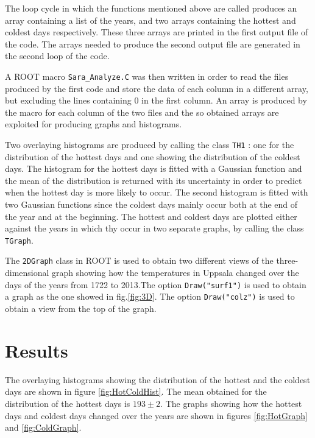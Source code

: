 \medskip

The loop cycle in which the functions mentioned above are called produces an array containing a list of the years, and two arrays containing the hottest and coldest days respectively. These three arrays are printed in the first output file of the code.
The arrays needed to produce the second output file are generated in the second loop of the code.

\medskip
\medskip

A ROOT macro \texttt{Sara{\_}Analyze.C}  was then written in order to read the files produced by the first code and store the data of each column in a different array, but excluding the lines containing $0$ in the first column. An array is produced by the macro for each column of the two files and the so obtained arrays are exploited for producing graphs and histograms.

\medskip
\medskip
Two overlaying histograms are produced by calling the class \texttt{TH1} : one for the distribution of the hottest days and one showing the distribution of the coldest days. The histogram for the hottest days is fitted with a Gaussian function and the mean of the distribution is returned with its uncertainty in order to predict when the hottest day is more likely to occur. The second histogram is fitted with two Gaussian functions since the coldest days mainly occur both at the end of the year and at the beginning. The hottest and coldest days are
plotted either against the years in which thy occur in two separate graphs, by calling the class \texttt{TGraph}.

\medskip
\medskip

The \texttt{2DGraph} class in ROOT is used to obtain two different views of the three-dimensional graph showing how the temperatures in Uppsala changed over the days of the years from 1722 to 2013.The option \texttt{Draw("surf1")} is used to obtain a graph as the one showed in fig.\ref{fig:3D}. The option \texttt{Draw("colz")} is used to obtain a view from the top of the graph.


\section{Results}\label{sec:Results}

The overlaying histograms showing the distribution of the hottest and the coldest days are shown in figure \ref{fig:HotColdHist}.
The mean obtained for the distribution of the hottest days is $193 \pm 2$. The graphs showing how the hottest days and coldest days changed over the years are shown in figures  \ref{fig:HotGraph} and \ref{fig:ColdGraph}. 


